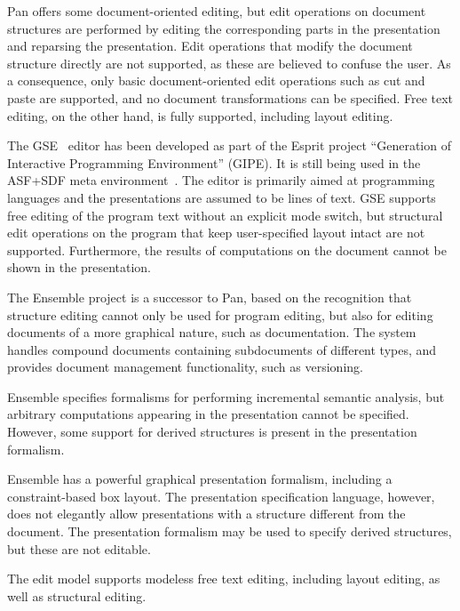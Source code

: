 Pan offers some document-oriented editing, but edit operations on document structures are performed by editing the corresponding parts in the presentation and reparsing the presentation. Edit operations that modify the document structure directly are not supported, as these are believed to confuse the user. As a consequence, only basic document-oriented edit operations such as cut and paste are supported, and no document transformations can be specified. Free text editing, on the other hand, is fully supported, including layout editing. 


The GSE~\cite{koorn92gse} editor has been developed as part of the Esprit project ``Generation of Interactive Programming Environment'' (GIPE). It is still being used in the ASF+SDF meta environment~\cite{klint93asfsdf}. The editor is primarily aimed at programming languages and the presentations are assumed to be lines of text. GSE supports free editing of the program text without an explicit mode switch, but structural edit operations on the program that keep user-specified layout intact are not supported. Furthermore, the results of computations on the document cannot be shown in the presentation.


The Ensemble project is a successor to Pan, based on the recognition that structure editing cannot only be used for program editing, but also for editing documents of a more graphical nature, such as documentation. The system handles compound documents containing subdocuments of different types, and provides document management functionality, such as versioning.

Ensemble specifies formalisms for performing incremental semantic analysis, but arbitrary computations appearing in the presentation cannot be specified. However, some support for derived structures is present in the presentation formalism.

Ensemble has a powerful graphical presentation formalism, including a constraint-based box layout. The presentation specification language, however, does not elegantly allow presentations with a structure different from the document. The presentation formalism may be used to specify derived structures, but these are not editable.

The edit model supports modeless free text editing, including layout editing, as well as structural editing.

